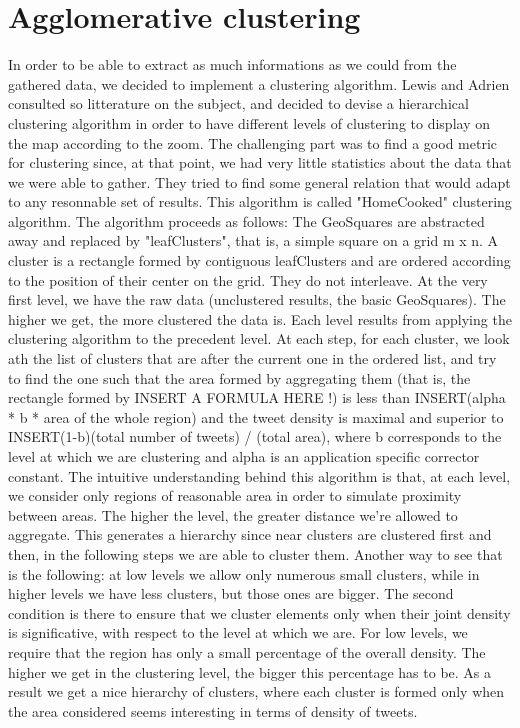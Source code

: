 \section{ Agglomerative clustering}
\label{sec:agg_clustering}
In order to be able to extract as much informations as we could from the gathered data, we decided to implement a clustering algorithm. Lewis and Adrien consulted so litterature on the subject, and decided to devise a hierarchical clustering algorithm in order to have different levels of clustering to display on the map according to the zoom. 
The challenging part was to find a good metric for clustering since, at that point, we had very little statistics about the data that we were able to gather. They tried to find some general relation that would adapt to any resonnable set of results. This algorithm is called "HomeCooked" clustering algorithm.
The algorithm proceeds as follows: 
The GeoSquares are abstracted away and replaced by "leafClusters", that is, a simple square on a grid m x n. A cluster is a rectangle formed by contiguous leafClusters and are ordered according to the position of their center on the grid. They do not interleave. 
At the very first level, we have the raw data (unclustered results, the basic GeoSquares). The higher we get, the more clustered the data is. 
Each level results from applying the clustering algorithm to the precedent level. 
At each step, for each cluster, we look ath the list of clusters that are after the current one in the ordered list, and try to find the one such that the area formed by aggregating them (that is, the rectangle formed by INSERT A FORMULA HERE !) is less than INSERT(alpha * b * area of the whole region) and the tweet density is maximal and superior to INSERT(1-b)(total number of tweets) / (total area), where b corresponds to the level at which we are clustering and alpha is an application specific corrector constant. 
The intuitive understanding behind this algorithm is that, at each level, we consider only regions of reasonable area in order to simulate proximity between areas. The higher the level, the greater distance we're allowed to aggregate. This generates a hierarchy since near clusters are clustered first and then, in the following steps we are able to cluster them. Another way to see that is the following: at low levels we allow only numerous small clusters, while in higher levels we have less clusters, but those ones are bigger. The second condition is there to ensure that we cluster elements only when their joint density is significative, with respect to the level at which we are. For low levels, we require that the region has only a small percentage of the overall density. The higher we get in the clustering level, the bigger this percentage has to be. As a result we get a nice hierarchy of clusters, where each cluster is formed only when the area considered seems interesting in terms of density of tweets. 
